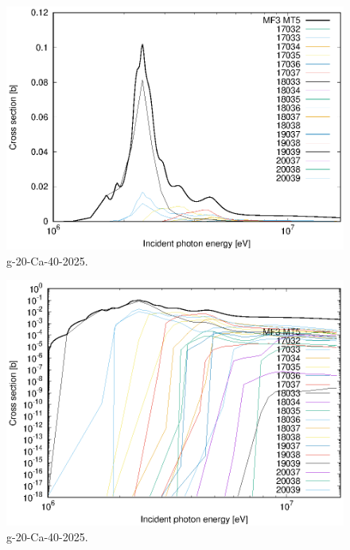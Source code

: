 \begin{figure}
 \includegraphics[width=\linewidth]{eps/g_20-Ca-40_2025.eps}
  \caption{g-20-Ca-40-2025.}
\end{figure}
\begin{figure}
 \includegraphics[width=\linewidth]{eps-log/g_20-Ca-40_2025.eps}
 \caption{g-20-Ca-40-2025.}
\end{figure}
\newpage \clearpage

